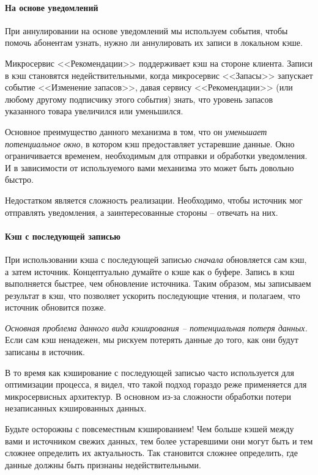 \documentclass[%
	11pt,
	a4paper,
	utf8,
		]{article}
\begin{document}
\paragraph{На основе уведомлений} При аннулировании на основе уведомлений мы используем события, чтобы помочь абонентам узнать, нужно ли аннулировать их записи в локальном кэше.

Микросервис <<Рекомендации>> поддерживает кэш на стороне клиента. Записи в кэш становятся недействительными, когда микросервис <<Запасы>> запускает событие <<Изменение запасов>>, давая сервису <<Рекомендации>> (или любому другому подписчику этого события) знать, что уровень запасов указанного товара увеличился или уменьшился.

Основное преимущество данного механизма в том, что он \emph{уменьшает потенциальное окно}, в котором кэш предоставляет устаревшие данные. Окно ограничивается временем, необходимым для отправки и обработки уведомления. И в зависимости от используемого вами механизма это может быть довольно быстро.

Недостатком является сложность реализации. Необходимо, чтобы источник мог отправлять уведомления, а заинтересованные стороны -- отвечать на них.

\paragraph{Кэш с последующей записью} При использовании кэша с последующей записью \emph{сначала} обновляется сам кэш, а затем источник. Концептуально думайте о кэше как о буфере. Запись в кэш выполняется быстрее, чем обновление источника. Таким образом, мы записываем результат в кэш, что позволяет ускорить последующие чтения, и полагаем, что источник обновится позже.

\emph{Основная проблема данного вида кэширования -- потенциальная потеря данных.} Если сам кэш ненадежен, мы рискуем потерять данные до того, как они будут записаны в источник.

В то время как кэширование с последующей записью часто используется для оптимизации процесса, я видел, что такой подход гораздо реже применяется для микросервисных архитектур. В основном из-за сложности обработки потери незаписанных кэшированных данных.

Будьте осторожны с повсеместным кэшированием! Чем больше кэшей между вами и источником свежих данных, тем более устаревшими они могут быть и тем сложнее определить их актуальность. Так становится сложнее определить, где данные должны быть признаны недействительными. 
\end{document}
